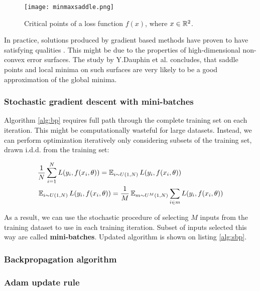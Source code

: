 \begin{figure}[h!]
  \centering
    \texttt{[image: minmaxsaddle.png]}
  \caption{Critical points of a loss function $f(x)$, where $x \in \Bbb{R}^2$.}
  \label{fig:critical}
\end{figure}


In practice, solutions produced by gradient based methods have proven to have satisfying qualities \cite{Szegedy2016,He2015}.
This might be due to the properties of high-dimensional non-convex error surfaces. The study by Y.Dauphin et al. \cite{Dauphin14} concludes, that saddle points and local minima on such surfaces are very likely to be a good approximation of the global minima.

\subsubsection{Stochastic gradient descent with mini-batches}

Algorithm \ref{alg:bp} requires full path through the complete training set on each iteration.
This might be computationally wasteful for large datasets. Instead, we can perform optimization iteratively only considering subsets of the training set, drawn i.d.d. from the training set:

\begin{equation*}\label{eq:sopt}
  \begin{aligned}
  & \frac{1}{N} \sum_{i=1}^{N} L(y_i, f(x_i, \theta)) = \operatorname{\mathbb{E}}_{i \sim U(1,N) } L(y_i, f(x_i, \theta)) \\
  & \operatorname{\mathbb{E}}_{i \sim U(1,N) } L(y_i, f(x_i, \theta))= \frac{1}{M} \operatorname{\mathbb{E}}_{m \sim U^M(1,N) } \sum_{i \in m} L(y_i, f(x_i, \theta))
  \end{aligned}
\end{equation*}

As a result, we can use the stochastic procedure of selecting $M$ inputs from the training dataset to use in each training iteration.
Subset of inputs selected this way are called \textbf{mini-batches}. Updated algorithm is shown on listing \ref{alg:sbp}.



\subsubsection{Backpropagation algorithm}

\subsubsection{Adam update rule}

